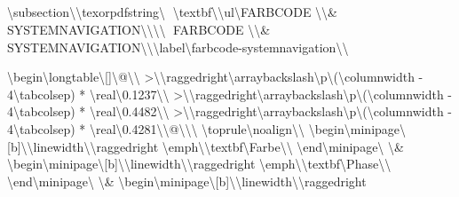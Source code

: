 \hypertarget{section-1}{%
\subsection{}\label{section-1}}

\hypertarget{farbcode-systemnavigation}{%
\textbackslash{}subsection\textbackslash{}{\textbackslash{}texorpdfstring\textbackslash{}{🎨 \textbackslash{}textbf\textbackslash{}{\textbackslash{}ul\textbackslash{}{FARBCODE \textbackslash{}\textbackslash{}& SYSTEMNAVIGATION\textbackslash{}}\textbackslash{}}\textbackslash{}}\textbackslash{}{🎨 FARBCODE \textbackslash{}\textbackslash{}& SYSTEMNAVIGATION\textbackslash{}}\textbackslash{}}\textbackslash{}label\textbackslash{}{farbcode-systemnavigation\textbackslash{}}\textbackslash{}}

\textbackslash{}begin\textbackslash{}{longtable\textbackslash{}}[]\textbackslash{}{@\textbackslash{}{\textbackslash{}}
  >\textbackslash{}{\textbackslash{}raggedright\textbackslash{}arraybackslash\textbackslash{}}p\textbackslash{}{(\textbackslash{}columnwidth - 4\textbackslash{}tabcolsep) * \textbackslash{}real\textbackslash{}{0.1237\textbackslash{}}\textbackslash{}}
  >\textbackslash{}{\textbackslash{}raggedright\textbackslash{}arraybackslash\textbackslash{}}p\textbackslash{}{(\textbackslash{}columnwidth - 4\textbackslash{}tabcolsep) * \textbackslash{}real\textbackslash{}{0.4482\textbackslash{}}\textbackslash{}}
  >\textbackslash{}{\textbackslash{}raggedright\textbackslash{}arraybackslash\textbackslash{}}p\textbackslash{}{(\textbackslash{}columnwidth - 4\textbackslash{}tabcolsep) * \textbackslash{}real\textbackslash{}{0.4281\textbackslash{}}\textbackslash{}}@\textbackslash{}{\textbackslash{}}\textbackslash{}}
\textbackslash{}toprule\textbackslash{}noalign\textbackslash{}{\textbackslash{}}
\textbackslash{}begin\textbackslash{}{minipage\textbackslash{}}[b]\textbackslash{}{\textbackslash{}linewidth\textbackslash{}}\textbackslash{}raggedright
\textbackslash{}emph\textbackslash{}{\textbackslash{}textbf\textbackslash{}{Farbe\textbackslash{}}\textbackslash{}}
\textbackslash{}end\textbackslash{}{minipage\textbackslash{}} \textbackslash{}& \textbackslash{}begin\textbackslash{}{minipage\textbackslash{}}[b]\textbackslash{}{\textbackslash{}linewidth\textbackslash{}}\textbackslash{}raggedright
\textbackslash{}emph\textbackslash{}{\textbackslash{}textbf\textbackslash{}{Phase\textbackslash{}}\textbackslash{}}
\textbackslash{}end\textbackslash{}{minipage\textbackslash{}} \textbackslash{}& \textbackslash{}begin\textbackslash{}{minipage\textbackslash{}}[b]\textbackslash{}{\textbackslash{}linewidth\textbackslash{}}\textbackslash{}raggedright
